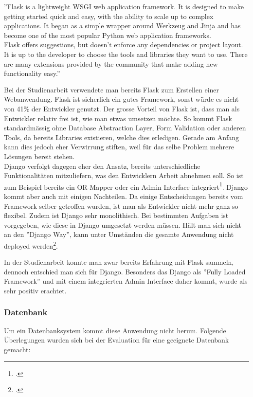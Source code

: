 ''Flask is a lightweight WSGI web application framework. It is designed to make getting started quick and easy, with the ability to scale up to complex applications. It began as a simple wrapper around Werkzeug and Jinja and has become one of the most popular Python web application frameworks. \\
Flask offers suggestions, but doesn't enforce any dependencies or project layout. It is up to the developer to choose the tools and libraries they want to use. There are many extensions provided by the community that make adding new functionality easy.''

Bei der Studienarbeit verwendete man bereits Flask zum Erstellen einer Webanwendung. Flask ist sicherlich ein gutes Framework, sonst würde es nicht von 41\% der Entwickler genutzt. Der grosse Vorteil von Flask ist, dass man als Entwickler relativ frei ist, wie man etwas umsetzen möchte. So kommt Flask standardmässig ohne Database Abstraction Layer, Form Validation oder anderen Tools, da bereits Libraries existieren, welche dies erledigen. Gerade am Anfang kann dies jedoch eher Verwirrung stiften, weil für das selbe Problem mehrere Lösungen bereit stehen. \\

Django verfolgt dagegen eher den Ansatz, bereits unterschiedliche Funktionalitäten mitzuliefern, was den Entwicklern Arbeit abnehmen soll. So ist zum Beispiel bereits ein OR-Mapper oder ein Admin Interface integriert\footcite{django:overview}. 
Django kommt aber auch mit einigen Nachteilen. Da einige Entscheidungen bereits vom Framework selber getroffen wurden, ist man als Entwickler nicht mehr ganz so flexibel. Zudem ist Django sehr monolithisch. Bei bestimmten Aufgaben ist vorgegeben, wie diese in Django umgesetzt werden müssen. Hält man sich nicht an den ''Django Way'', kann unter Umständen die gesamte Anwendung nicht deployed werden\footcite{django:advantages_disadvantages}.


In der Studienarbeit konnte man zwar bereits Erfahrung mit Flask sammeln, dennoch entschied man sich für Django. Besonders das Django als ''Fully Loaded Framework'' und mit einem integrierten Admin Interface daher kommt, wurde als sehr positiv erachtet.


\subsubsection*{Datenbank}
Um ein Datenbanksystem kommt diese Anwendung nicht herum. Folgende Überlegungen wurden sich bei der Evaluation für eine geeignete Datenbank gemacht:


